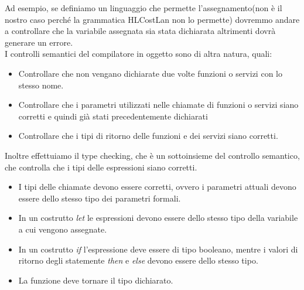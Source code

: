 \documentclass[../../main.tex]{subfiles}
\begin{document}
Ad esempio, se definiamo un linguaggio che permette l'assegnamento(non è il nostro caso perché la grammatica HLCostLan non lo permette) dovremmo andare a controllare che la variabile assegnata sia stata dichiarata altrimenti dovrà generare un errore.\\
I controlli semantici del compilatore in oggetto sono di altra natura, quali:
\begin{itemize}
    \item Controllare che non vengano dichiarate due volte funzioni o servizi con lo stesso nome.
    \item Controllare che i parametri utilizzati nelle chiamate di funzioni o servizi siano corretti e quindi già stati precedentemente dichiarati
    \item Controllare che i tipi di ritorno delle funzioni e dei servizi siano corretti.
\end{itemize}
Inoltre effettuiamo il type checking, che è un sottoinsieme del controllo semantico, che controlla che i tipi delle espressioni siano corretti.\\
\begin{itemize}
    \item I tipi delle chiamate devono essere corretti, ovvero i parametri attuali devono essere dello stesso tipo dei parametri formali.
    \item In un costrutto \textit{let} le espressioni devono essere dello stesso tipo della variabile a cui vengono assegnate.
    \item In un costrutto \textit{if} l'espressione deve essere di tipo booleano, mentre i valori di ritorno degli statemente \textit{then} e \textit{else} devono essere dello stesso tipo.
    \item La funzione deve tornare il tipo dichiarato.
\end{itemize}
\end{document}
